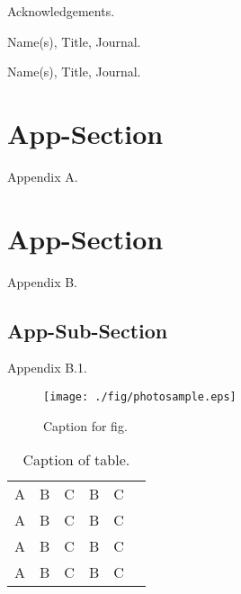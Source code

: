 \documentclass[publish,conference,paper]{conferencearticle}
\begin{document}
\acknowledgements
Acknowledgements.

%

\begin{thebibliography}{99}

 Name(s),
Title, Journal.

 Name(s),
Title, Journal.

\end{thebibliography}

\appendix

\section{App-Section}
Appendix A.

\section{App-Section}
Appendix B.


\subsection{App-Sub-Section}
Appendix B.1.



\begin{figure}[t]
\centering
\texttt{[image: ./fig/photosample.eps]}
\caption{Caption for fig.}
\label{fig}
\end{figure}


\begin{table}[t]
  \begin{center}
    \caption{Caption of table.}
    \begin{tabular}[t]{cccccc} 
    \hline
    A & B & C & B & C\\
    A & B & C & B & C\\
    A & B & C & B & C\\
    A & B & C & B & C\\
    \hline
    \end{tabular}
    \label{table}
  \end{center}
\end{table}

\end{document}
